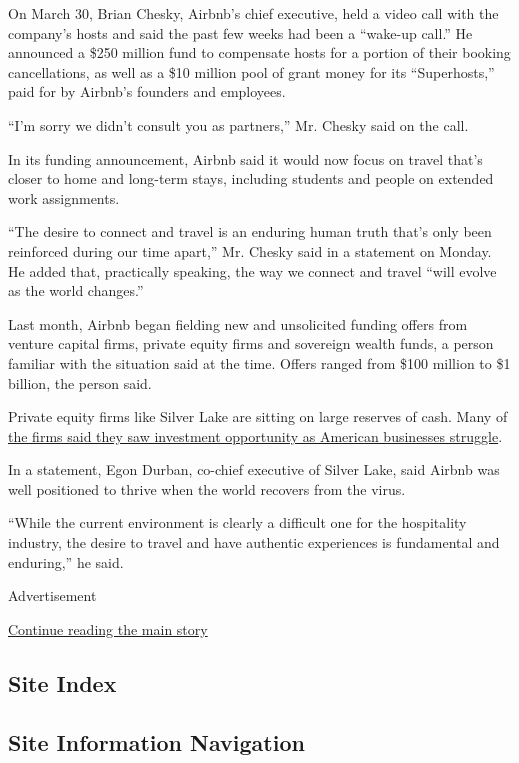 On March 30, Brian Chesky, Airbnb's chief executive, held a video call
with the company's hosts and said the past few weeks had been a
``wake-up call.'' He announced a \$250 million fund to compensate hosts
for a portion of their booking cancellations, as well as a \$10 million
pool of grant money for its ``Superhosts,'' paid for by Airbnb's
founders and employees.

``I'm sorry we didn't consult you as partners,'' Mr. Chesky said on the
call.

In its funding announcement, Airbnb said it would now focus on travel
that's closer to home and long-term stays, including students and people
on extended work assignments.

``The desire to connect and travel is an enduring human truth that's
only been reinforced during our time apart,'' Mr. Chesky said in a
statement on Monday. He added that, practically speaking, the way we
connect and travel ``will evolve as the world changes.''

Last month, Airbnb began fielding new and unsolicited funding offers
from venture capital firms, private equity firms and sovereign wealth
funds, a person familiar with the situation said at the time. Offers
ranged from \$100 million to \$1 billion, the person said.

Private equity firms like Silver Lake are sitting on large reserves of
cash. Many of
\href{https://www.nytimes3xbfgragh.onion/2020/04/03/business/private-equity-hedge-funds-coronavirus.html}{the
firms said they saw investment opportunity as American businesses
struggle}.

In a statement, Egon Durban, co-chief executive of Silver Lake, said
Airbnb was well positioned to thrive when the world recovers from the
virus.

``While the current environment is clearly a difficult one for the
hospitality industry, the desire to travel and have authentic
experiences is fundamental and enduring,'' he said.

Advertisement

\protect\hyperlink{after-bottom}{Continue reading the main story}

\hypertarget{site-index}{%
\subsection{Site Index}\label{site-index}}

\hypertarget{site-information-navigation}{%
\subsection{Site Information
Navigation}\label{site-information-navigation}}

